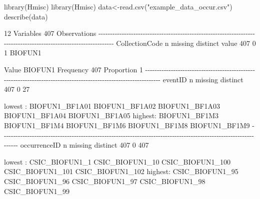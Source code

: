 \documentclass[
  letterpaper,
  DIV=11,
  numbers=noendperiod,
  oneside]{scrreprt}
\newenvironment{Shaded}{\begin{snugshade}}{\end{snugshade}}
\newcommand{\DecValTok}[1]{\textcolor[rgb]{0.68,0.00,0.00}{#1}}
\newcommand{\FunctionTok}[1]{\textcolor[rgb]{0.28,0.35,0.67}{#1}}
\newcommand{\NormalTok}[1]{\textcolor[rgb]{0.00,0.23,0.31}{#1}}
\newcommand{\OtherTok}[1]{\textcolor[rgb]{0.00,0.23,0.31}{#1}}
\newcommand{\SpecialCharTok}[1]{\textcolor[rgb]{0.37,0.37,0.37}{#1}}
\newcommand{\StringTok}[1]{\textcolor[rgb]{0.13,0.47,0.30}{#1}}
\begin{document}
\begin{Shaded}
\begin{Highlighting}[]
\FunctionTok{library}\NormalTok{(Hmisc)}
\FunctionTok{library}\NormalTok{(Hmisc)}
\NormalTok{data}\OtherTok{\textless{}{-}}\FunctionTok{read.csv}\NormalTok{(}\StringTok{"example\_data\_occur.csv"}\NormalTok{)}
\FunctionTok{describe}\NormalTok{(data)}
 
 \DecValTok{12}\NormalTok{  Variables      }\DecValTok{407}\NormalTok{  Observations}
\SpecialCharTok{{-}{-}{-}{-}{-}{-}{-}{-}{-}{-}{-}{-}{-}{-}{-}{-}{-}{-}{-}{-}{-}{-}{-}{-}{-}{-}{-}{-}{-}{-}{-}{-}{-}{-}{-}{-}{-}{-}{-}{-}{-}{-}{-}{-}{-}{-}{-}{-}{-}{-}{-}{-}{-}{-}{-}{-}{-}{-}{-}{-}{-}{-}{-}{-}{-}{-}{-}{-}{-}{-}{-}{-}{-}{-}{-}{-}{-}{-}{-}{-}{-}{-}{-}{-}{-}{-}{-}{-}{-}{-}{-}{-}{-}{-}{-}{-}{-}{-}{-}{-}{-}{-}{-}{-}{-}{-}{-}{-}{-}{-}{-}{-}{-}{-}}
\NormalTok{CollectionCode }
\NormalTok{       n  missing distinct    value }
     \DecValTok{407}        \DecValTok{0}        \DecValTok{1}\NormalTok{  BIOFUN1 }
                  
\NormalTok{Value      BIOFUN1}
\NormalTok{Frequency      }\DecValTok{407}
\NormalTok{Proportion       }\DecValTok{1}
\SpecialCharTok{{-}{-}{-}{-}{-}{-}{-}{-}{-}{-}{-}{-}{-}{-}{-}{-}{-}{-}{-}{-}{-}{-}{-}{-}{-}{-}{-}{-}{-}{-}{-}{-}{-}{-}{-}{-}{-}{-}{-}{-}{-}{-}{-}{-}{-}{-}{-}{-}{-}{-}{-}{-}{-}{-}{-}{-}{-}{-}{-}{-}{-}{-}{-}{-}{-}{-}{-}{-}{-}{-}{-}{-}{-}{-}{-}{-}{-}{-}{-}{-}{-}{-}{-}{-}{-}{-}{-}{-}{-}{-}{-}{-}{-}{-}{-}{-}{-}{-}{-}{-}{-}{-}{-}{-}{-}{-}{-}{-}{-}{-}{-}{-}{-}{-}}
\NormalTok{eventID }
\NormalTok{       n  missing distinct }
     \DecValTok{407}        \DecValTok{0}       \DecValTok{27} 

\NormalTok{lowest }\SpecialCharTok{:}\NormalTok{ BIOFUN1\_BF1A01 BIOFUN1\_BF1A02 BIOFUN1\_BF1A03 BIOFUN1\_BF1A04 BIOFUN1\_BF1A05}
\NormalTok{highest}\SpecialCharTok{:}\NormalTok{ BIOFUN1\_BF1M3  BIOFUN1\_BF1M4  BIOFUN1\_BF1M6  BIOFUN1\_BF1M8  BIOFUN1\_BF1M9 }
\SpecialCharTok{{-}{-}{-}{-}{-}{-}{-}{-}{-}{-}{-}{-}{-}{-}{-}{-}{-}{-}{-}{-}{-}{-}{-}{-}{-}{-}{-}{-}{-}{-}{-}{-}{-}{-}{-}{-}{-}{-}{-}{-}{-}{-}{-}{-}{-}{-}{-}{-}{-}{-}{-}{-}{-}{-}{-}{-}{-}{-}{-}{-}{-}{-}{-}{-}{-}{-}{-}{-}{-}{-}{-}{-}{-}{-}{-}{-}{-}{-}{-}{-}{-}{-}{-}{-}{-}{-}{-}{-}{-}{-}{-}{-}{-}{-}{-}{-}{-}{-}{-}{-}{-}{-}{-}{-}{-}{-}{-}{-}{-}{-}{-}{-}{-}{-}}
\NormalTok{occurrenceID }
\NormalTok{       n  missing distinct }
     \DecValTok{407}        \DecValTok{0}      \DecValTok{407} 

\NormalTok{lowest }\SpecialCharTok{:}\NormalTok{ CSIC\_BIOFUN1\_1   CSIC\_BIOFUN1\_10  CSIC\_BIOFUN1\_100 CSIC\_BIOFUN1\_101 CSIC\_BIOFUN1\_102}
\NormalTok{highest}\SpecialCharTok{:}\NormalTok{ CSIC\_BIOFUN1\_95  CSIC\_BIOFUN1\_96  CSIC\_BIOFUN1\_97  CSIC\_BIOFUN1\_98  CSIC\_BIOFUN1\_99 }
\end{Highlighting}
\end{Shaded}
\end{document}
